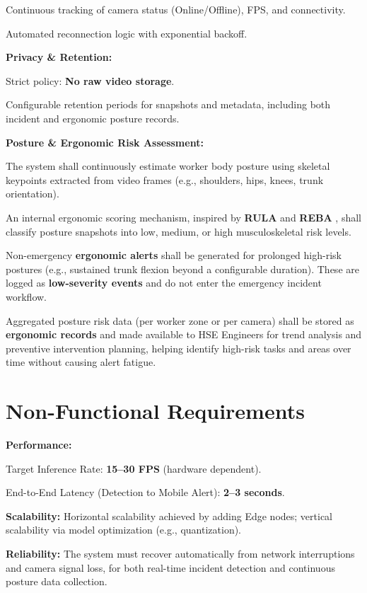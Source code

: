 Continuous tracking of camera status (Online/Offline), FPS, and connectivity.

Automated reconnection logic with exponential backoff.

\textbf{Privacy \& Retention:}

Strict policy: \textbf{No raw video storage}.

Configurable retention periods for snapshots and metadata, including both incident and ergonomic posture records.

\textbf{Posture \& Ergonomic Risk Assessment:}

The system shall continuously estimate worker body posture using skeletal keypoints extracted from video frames (e.g., shoulders, hips, knees, trunk orientation).

An internal ergonomic scoring mechanism, inspired by \textbf{RULA} and \textbf{REBA} \cite{mcatamney1993rula,hignett2000reba}, shall classify posture snapshots into low, medium, or high musculoskeletal risk levels.

Non-emergency \textbf{ergonomic alerts} shall be generated for prolonged high-risk postures (e.g., sustained trunk flexion beyond a configurable duration). These are logged as \textbf{low-severity events} and do not enter the emergency incident workflow.

Aggregated posture risk data (per worker zone or per camera) shall be stored as \textbf{ergonomic records} and made available to HSE Engineers for trend analysis and preventive intervention planning, helping identify high-risk tasks and areas over time without causing alert fatigue.

\section{Non-Functional Requirements}

\textbf{Performance:}

Target Inference Rate: \textbf{15–30 FPS} (hardware dependent).

End-to-End Latency (Detection to Mobile Alert): \textbf{2–3 seconds}.

\textbf{Scalability:} Horizontal scalability achieved by adding Edge nodes; vertical scalability via model optimization (e.g., quantization).

\textbf{Reliability:} The system must recover automatically from network interruptions and camera signal loss, for both real-time incident detection and continuous posture data collection.

